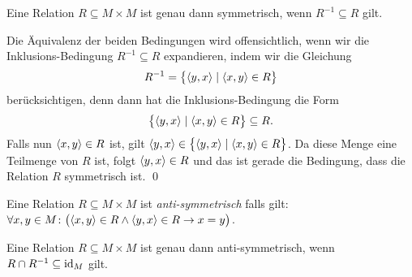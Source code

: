 \begin{Satz}
Eine Relation $R \subseteq M \times M$ ist genau dann symmetrisch, wenn $R^{-1} \subseteq R$ gilt.
\end{Satz}

\proof
Die \"{A}quivalenz der beiden Bedingungen wird offensichtlich, wenn wir die Inklusions-Bedingung
$R^{-1} \subseteq R$ expandieren, indem wir die Gleichung
\[ R^{-1} = \bigl\{ \pair(y,x) \mid \pair(x,y) \in R \bigr\}  \]
ber\"{u}cksichtigen, denn dann hat die Inklusions-Bedingung die Form
\[ \bigl\{ \pair(y,x) \mid \pair(x,y) \in R \bigr\} \subseteq  R. \]
Falls nun $\pair(x,y) \in R$ ist, gilt $\pair(y,x) \in \bigl\{ \pair(y,x) \mid \pair(x,y) \in R \bigr\}$.
Da diese Menge eine Teilmenge von $R$ ist, folgt $\pair(y,x)  \in R$ und das ist gerade die Bedingung, dass
die Relation $R$ symmetrisch ist. \qed

\begin{Definition}
Eine Relation $R \subseteq M \times M$  ist \emph{anti-symmetrisch} falls gilt: \\[0.2cm]
\hspace*{1.3cm} 
$\forall x, y \in M \colon \bigl(\pair(x,y) \in R \wedge \pair(y,x) \in R \rightarrow x = y\bigr)$. \eox
\end{Definition}

\begin{Satz}
Eine Relation $R \subseteq M \times M$  ist genau dann anti-symmetrisch, wenn
$R \cap R^{-1} \subseteq \mbox{\rm id}_{M}$ gilt.
\end{Satz}

